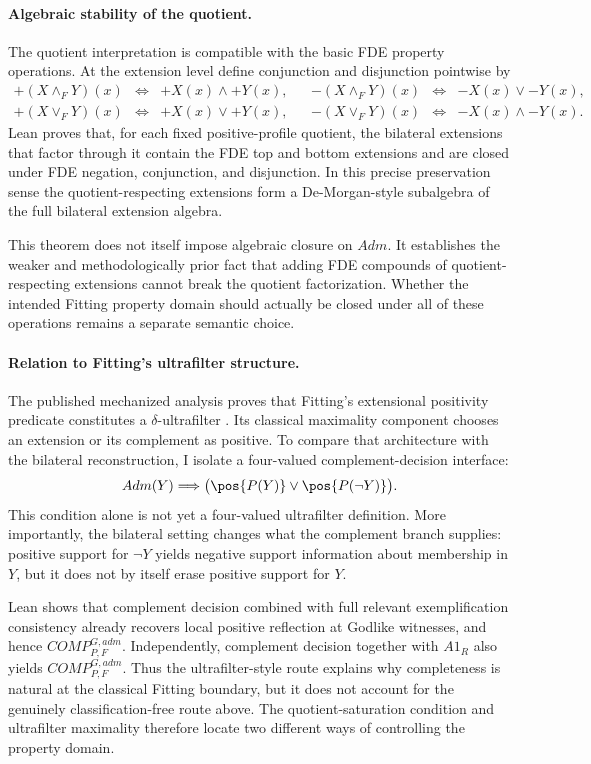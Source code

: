 \paragraph{Algebraic stability of the quotient.}
The quotient interpretation is compatible with the basic FDE property operations. At the extension level define conjunction and disjunction pointwise by
\[
\begin{array}{rclcrcl}
 +(X\wedge_FY)(x)&\Leftrightarrow&+X(x)\land+Y(x),&&
 -(X\wedge_FY)(x)&\Leftrightarrow&-X(x)\lor-Y(x),\\
 +(X\vee_FY)(x)&\Leftrightarrow&+X(x)\lor+Y(x),&&
 -(X\vee_FY)(x)&\Leftrightarrow&-X(x)\land-Y(x).
\end{array}
\]
Lean proves that, for each fixed positive-profile quotient, the bilateral extensions that factor through it contain the FDE top and bottom extensions and are closed under FDE negation, conjunction, and disjunction. In this precise preservation sense the quotient-respecting extensions form a De-Morgan-style subalgebra of the full bilateral extension algebra.

This theorem does not itself impose algebraic closure on \(Adm\). It establishes the weaker and methodologically prior fact that adding FDE compounds of quotient-respecting extensions cannot break the quotient factorization. Whether the intended Fitting property domain should actually be closed under all of these operations remains a separate semantic choice.

\paragraph{Relation to Fitting's ultrafilter structure.}
The published mechanized analysis proves that Fitting's extensional positivity predicate constitutes a \(\delta\)-ultrafilter \cite{BenzmuellerFuenmayor2019}. Its classical maximality component chooses an extension or its complement as positive. To compare that architecture with the bilateral reconstruction, I isolate a four-valued complement-decision interface:
\[
  Adm(Y)\Longrightarrow
  \bigl(\pos{P(Y)}\lor\pos{P(\neg Y)}\bigr).
\]
This condition alone is not yet a four-valued ultrafilter definition. More importantly, the bilateral setting changes what the complement branch supplies: positive support for \(\neg Y\) yields negative support information about membership in \(Y\), but it does not by itself erase positive support for \(Y\).

Lean shows that complement decision combined with full relevant exemplification consistency already recovers local positive reflection at Godlike witnesses, and hence \(COMP_{P,F}^{G,adm}\). Independently, complement decision together with \(A1_R\) also yields \(COMP_{P,F}^{G,adm}\). Thus the ultrafilter-style route explains why completeness is natural at the classical Fitting boundary, but it does not account for the genuinely classification-free route above. The quotient-saturation condition and ultrafilter maximality therefore locate two different ways of controlling the property domain.

